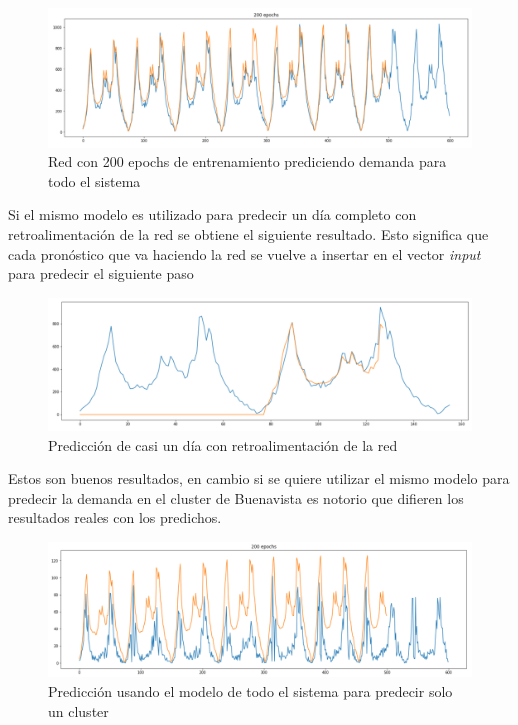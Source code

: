 \documentclass[12pt,spanish]{article}
\begin{document}
	\begin{figure}[H]
		\centering
		\includegraphics[width=15cm]{Imagenes/full_200_epochs.PNG}
		\begin{centering}
			\caption{Red con 200 epochs de entrenamiento prediciendo demanda para todo el sistema}
		\end{centering}
	\end{figure}
	Si el mismo modelo es utilizado para predecir un día completo con retroalimentación de la red se obtiene el siguiente resultado. Esto significa que cada pronóstico que va haciendo la red se vuelve a insertar en el vector \textit{input} para predecir el siguiente paso
	\begin{figure}[H]
		\centering
		\includegraphics[width=15cm]{Imagenes/model_predict_1_day.PNG}
		\begin{centering}
			\caption{Predicción de casi un día con retroalimentación de la red}
		\end{centering}
	\end{figure}
	Estos son buenos resultados, en cambio si se quiere utilizar el mismo modelo para predecir la demanda en el cluster de Buenavista es notorio que difieren los resultados reales con los predichos.
	\begin{figure}[H]
		\centering
		\includegraphics[width=15cm]{Imagenes/model_predict_buenavista_cluster.PNG}
		\begin{centering}
			\caption{Predicción usando el modelo de todo el sistema para predecir solo un cluster}
		\end{centering}
	\end{figure}
	\newpage
\end{document}
